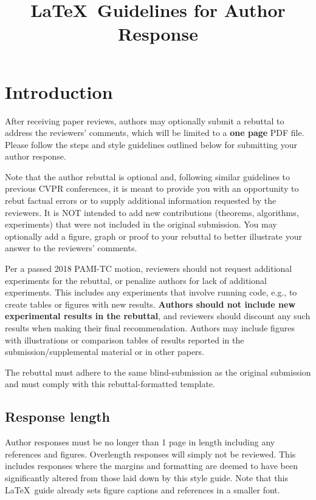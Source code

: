\documentclass[rebuttal]{cvpr}
\begin{document}
\title{\LaTeX\ Guidelines for Author Response}  %

\maketitle
\thispagestyle{empty}


\section{Introduction}

After receiving paper reviews, authors may optionally submit a rebuttal to address the reviewers' comments, which will be limited to a {\bf one page} PDF file.  Please follow the steps and style guidelines outlined below for submitting your author response.

Note that the author rebuttal is optional and, following similar guidelines to previous CVPR conferences, it is meant to provide you with an opportunity to rebut factual errors or to supply additional information requested by the reviewers. It is NOT intended to add new contributions (theorems, algorithms, experiments) that were not included in the original submission. You may optionally add a figure, graph or proof to your rebuttal to better illustrate your answer to the reviewers' comments.

Per a passed 2018 PAMI-TC motion, reviewers should not request additional experiments for the rebuttal, or penalize authors for lack of additional experiments. This includes any experiments that involve running code, e.g., to create tables or figures with new results.  \textbf{Authors should not include new experimental results in the rebuttal}, and reviewers should discount any such results when making their final recommendation. Authors may include figures with illustrations or comparison tables of results reported in the submission/supplemental material or in other papers. 

The rebuttal must adhere to the same blind-submission as the original submission and must comply with this rebuttal-formatted template.


\subsection{Response length}
Author responses must be no longer than 1 page in length including any references and figures.  Overlength responses will simply not be reviewed.  This includes responses where the margins and formatting are deemed to have been significantly altered from those laid down by this style guide.  Note that this \LaTeX\ guide already sets figure captions and references in a smaller font.
\end{document}
